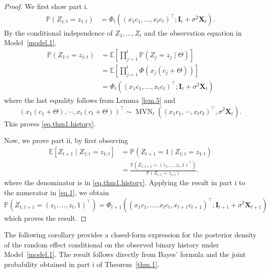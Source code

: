 \documentclass[11pt,authoryear]{elsarticle}
\def\P#1{{\mathbb{P}}\left(#1\right)}
\def\E#1{{\mathbb E}\left[#1\right]}
\theoremstyle{nopunct}
\numberwithin{equation}{section}
\begin{document}
\begin{proof}




We first show part i.
\begin{equation}\label{eq.thm1.history}
\begin{aligned}
\P{Z_{1:t}=z_{1:t}}
&=
\Phi_t
\left(
\left(
x_1c_1,\ldots,
x_tc_t
\right)^\top;
\boldsymbol I_t
+
\sigma^2\boldsymbol X_t
\right).
\end{aligned}
\end{equation}
By the conditional independence of
\(Z_1,\ldots,Z_t\) and the observation equation in Model~\ref{model.1},
\[
\begin{aligned}
\P{Z_{1:t}=z_{1:t}}
&=
\E{
\prod_{j=1}^{t}
\P{Z_j=z_j\mid\Theta}
}\\
&=
\E{
\prod_{j=1}^{t}
\Phi\left(x_j(c_j+\Theta)\right)
}\\
&=
\Phi_t
\left(
\left(
x_1c_1,\ldots,
x_tc_t
\right)^\top;
\boldsymbol I_t
+
\sigma^2\boldsymbol X_t
\right)
\end{aligned}
\]
where
the last equality follows from Lemma \ref{lem.5} and
\[
\left(x_1(c_1+\Theta), \cdots, x_t(c_t+\Theta)\right)^\top \sim \operatorname{MVN}_t\left(
\left(x_1c_1,\cdots,x_tc_t\right)^\top, \sigma^2\boldsymbol X_t
 \right).
\]
This proves
\eqref{eq.thm1.history}.



Now, we prove part ii, by first observing
\begin{equation}\label{eq.1}
\begin{aligned}
\E{Z_{t+1}\mid Z_{1:t}=z_{1:t}}
&=
\P{Z_{t+1}=1\mid Z_{1:t}=z_{1:t}}\\
&=
\frac{
\P{Z_{1:t+1}=(z_1,\ldots,z_t,1)^\top}
}{
\P{Z_{1:t}=z_{1:t}}
}.
\end{aligned}
\end{equation}
where the denominator is in \eqref{eq.thm1.history}. 
Applying the result in part i to the numerator in \eqref{eq.1}, we obtain
\[
\P{Z_{1:t+1}=(z_1,\ldots,z_t,1)^\top}=
\Phi_{t+1}
\left(
\left(
x_1c_1,\ldots,
x_tc_t,
x_{t+1}c_{t+1}
\right)^\top;
\boldsymbol I_{t+1}
+
\sigma^2\boldsymbol X_{t+1}
\right)
\]
which proves the result.
\end{proof}


The following corollary provides a closed-form expression for the
posterior density of the random effect conditional on the observed
binary history under Model~\ref{model.1}. The result follows directly from
Bayes' formula and the joint probability obtained in
part i of Theorem~\ref{thm.1}.
\end{document}

